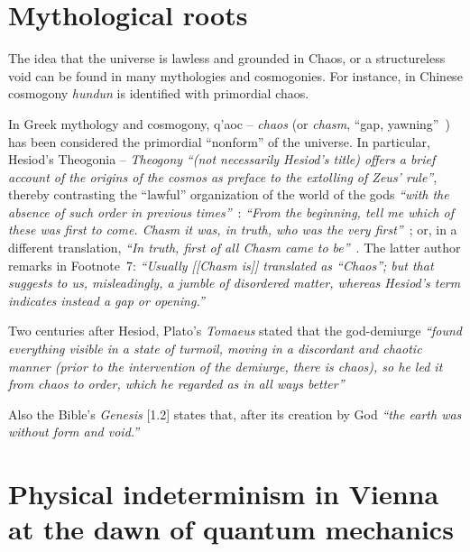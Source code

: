

\section{Mythological roots}

The idea that the universe is lawless and grounded in Chaos, or a structureless void can be found in many mythologies and cosmogonies.
For instance,
in Chinese cosmogony {\em hundun}  is identified with primordial chaos.

In Greek mythology and cosmogony, \textgreek{q'aoc} -- {\em chaos} (or {\em chasm}, ``gap, yawning''~\cite[p.~3]{gantz-earlyGreekMyth}) has been considered
the primordial ``nonform'' of the universe.
In particular, Hesiod's \textgreek{Theogonia} -- {\it Theogony}  
{\em ``(not necessarily Hesiod's title) offers a brief
account of the origins of the cosmos as preface to the extolling of Zeus' rule''},
thereby contrasting the ``lawful'' organization of the
world of the gods {\em ``with the absence of such order in previous times''}~\cite[p.~1]{gantz-earlyGreekMyth}:
{\em ``From the beginning, tell me which of these was first to come.
Chasm it was, in truth, who was the very first''}~\cite[115-116]{hesiod+700};
or, in a different translation,
{\em ``In truth, first of all Chasm came to be''}~\cite[115-116]{hesiod+700-2}.
The latter author remarks in Footnote~7:
{\em ``Usually [[Chasm is]] translated as ``Chaos''; but that suggests to us, misleadingly,
a jumble of disordered matter, whereas Hesiod's term
indicates instead a gap or opening.''}

Two centuries after Hesiod, Plato's {\em Tomaeus}  stated
that the god-demiurge {\em ``found everything visible
in a state of turmoil, moving in a discordant and chaotic
manner (prior to the intervention of the
demiurge, there is chaos), so he led it from chaos to order, which he regarded
as in all ways better''}~\cite[p.~18,127; 30a]{plato-Timaeus}


Also the Bible's {\em Genesis} [1.2] states that, after its creation by God {\em ``the earth was without form and void.''}

\section{Physical indeterminism in Vienna at the dawn of quantum mechanics}
\label{2016-pu-book-chapterpu-vi}

